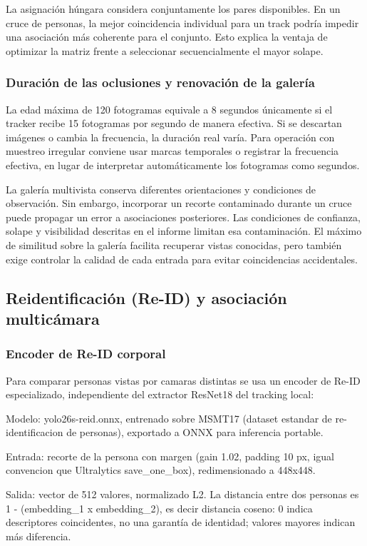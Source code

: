 \documentclass[12pt,letterpaper]{article}
\begin{document}
La asignación húngara considera conjuntamente los pares disponibles. En un cruce de personas, la mejor coincidencia individual para un track podría impedir una asociación más coherente para el conjunto. Esto explica la ventaja de optimizar la matriz frente a seleccionar secuencialmente el mayor solape.

\subsubsection{Duración de las oclusiones y renovación de la galería}
La edad máxima de 120 fotogramas equivale a 8 segundos únicamente si el tracker recibe 15 fotogramas por segundo de manera efectiva. Si se descartan imágenes o cambia la frecuencia, la duración real varía. Para operación con muestreo irregular conviene usar marcas temporales o registrar la frecuencia efectiva, en lugar de interpretar automáticamente los fotogramas como segundos.

La galería multivista conserva diferentes orientaciones y condiciones de observación. Sin embargo, incorporar un recorte contaminado durante un cruce puede propagar un error a asociaciones posteriores. Las condiciones de confianza, solape y visibilidad descritas en el informe limitan esa contaminación. El máximo de similitud sobre la galería facilita recuperar vistas conocidas, pero también exige controlar la calidad de cada entrada para evitar coincidencias accidentales.


\subsection{Reidentificación (Re-ID) y asociación multicámara}

\subsubsection{Encoder de Re-ID corporal}

Para comparar personas vistas por camaras distintas se usa un encoder de Re-ID especializado, independiente del extractor ResNet18 del tracking local:


Modelo: yolo26s-reid.onnx, entrenado sobre MSMT17 (dataset estandar de re-identificacion de personas), exportado a ONNX para inferencia portable.


Entrada: recorte de la persona con margen (gain 1.02, padding 10 px, igual convencion que Ultralytics save\_one\_box), redimensionado a 448x448.


Salida: vector de 512 valores, normalizado L2. La distancia entre dos personas es 1 - (embedding\_1  x  embedding\_2), es decir distancia coseno: 0 indica descriptores coincidentes, no una garantía de identidad; valores mayores indican más diferencia.
\end{document}
